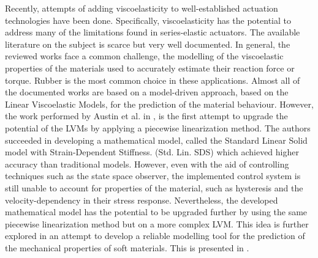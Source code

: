 Recently, attempts of adding viscoelasticity to well-established actuation technologies have been done. Specifically, viscoelasticity has the potential to address many of the limitations found in series-elastic actuators. The available literature on the subject is scarce but very well documented. In general, the reviewed works face a common challenge, the modelling of the viscoelastic properties of the materials used to accurately estimate their reaction force or torque. Rubber is the most common choice in these applications. Almost all of the documented works are based on a model-driven approach, based on the Linear Viscoelastic Models, for the prediction of the material behaviour. However, the work performed by Austin et al. in \cite{austin2015control}, is the first attempt to upgrade the potential of the LVMs by applying a piecewise linearization method. The authors succeeded in developing a mathematical model, called the Standard Linear Solid model with Strain-Dependent Stiffness. (Std. Lin. SDS) which achieved higher accuracy than traditional models. However, even with the aid of controlling techniques such as the state space observer, the implemented control system is still unable to account for properties of the material, such as hysteresis and the velocity-dependency in their stress response. Nevertheless, the developed mathematical model has the potential to be upgraded further by using the same piecewise linearization method but on a more complex LVM. This idea is further explored in an attempt to develop a reliable modelling tool for the prediction of the mechanical properties of soft materials. This is presented in .


